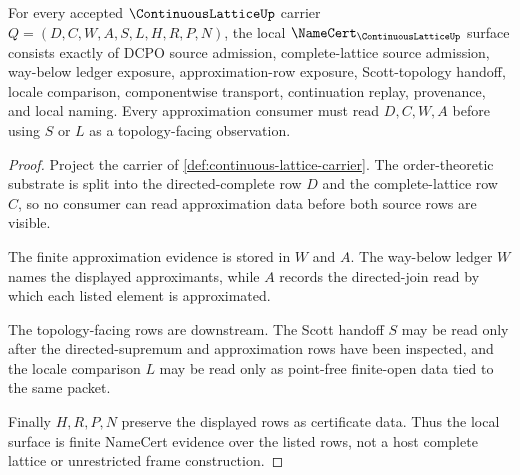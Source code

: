 \begin{theorem}
\label{thm:continuous-lattice-namecert-obligations}
For every accepted $\ContinuousLatticeUp$ carrier $Q=(D,C,W,A,S,L,H,R,P,N)$, the local $\NameCert_{\ContinuousLatticeUp}$ surface consists exactly of DCPO source admission, complete-lattice source admission, way-below ledger exposure, approximation-row exposure, Scott-topology handoff, locale comparison, componentwise transport, continuation replay, provenance, and local naming. Every approximation consumer must read $D,C,W,A$ before using $S$ or $L$ as a topology-facing observation.
\end{theorem}
\begin{proof}
Project the carrier of \autoref{def:continuous-lattice-carrier}. The order-theoretic substrate is split into the directed-complete row $D$ and the complete-lattice row $C$, so no consumer can read approximation data before both source rows are visible.

The finite approximation evidence is stored in $W$ and $A$. The way-below ledger $W$ names the displayed approximants, while $A$ records the directed-join read by which each listed element is approximated.

The topology-facing rows are downstream. The Scott handoff $S$ may be read only after the directed-supremum and approximation rows have been inspected, and the locale comparison $L$ may be read only as point-free finite-open data tied to the same packet.

Finally $H,R,P,N$ preserve the displayed rows as certificate data. Thus the local surface is finite NameCert evidence over the listed rows, not a host complete lattice or unrestricted frame construction.
\end{proof}

